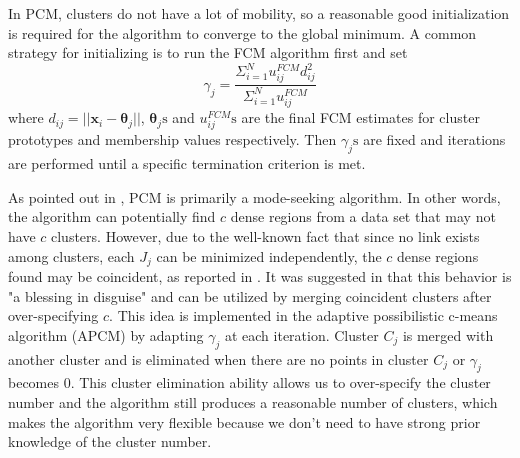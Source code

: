 \documentclass[journal,transmag]{IEEEtran}
\theoremstyle{definition}
\begin{document}
In PCM, clusters do not have a lot of mobility, so a reasonable good initialization is required for the algorithm to converge to the global minimum. A common strategy for initializing is to run the FCM algorithm first and set
\begin{equation}
\gamma_j=\frac{\Sigma_{i=1}^Nu_{ij}^{FCM}d^2_{ij}}{\Sigma_{i=1}^Nu_{ij}^{FCM}}
\end{equation}
where $d_{ij}=||\mathbf{x}_i-\boldsymbol{\theta}_j||$, $\boldsymbol{\theta}_j\text{s}$ and $u_{ij}^{FCM}\text{s}$ are the final FCM estimates for cluster prototypes and membership values respectively. Then $\gamma_j\text{s}$ are fixed and iterations are performed until a specific termination criterion is met.

As pointed out in \cite{krishnapuram_possibilistic_1996}, PCM is primarily a mode-seeking algorithm. In other words, the algorithm can potentially find $c$ dense regions from a data set that may not have $c$ clusters. However, due to the well-known fact that since no link exists among clusters, each $J_j$ can be minimized independently, the $c$ dense regions found may be coincident, as reported in \cite{barni_comments_1996}. It was suggested in \cite{krishnapuram_possibilistic_1996} that this behavior is "a blessing in disguise" and can be utilized by merging coincident clusters after over-specifying $c$. This idea is implemented in the adaptive possibilistic c-means algorithm (APCM) \cite{xenaki_novel_2016} by adapting $\gamma_j$ at each iteration. Cluster $C_j$ is merged with another cluster and is eliminated when there are no points in cluster $C_j$ or $\gamma_j$ becomes $0$. This cluster elimination ability allows us to over-specify the cluster number and the algorithm still produces a reasonable number of clusters, which makes the algorithm very flexible because we don't need to have strong prior knowledge of the cluster number.
\end{document}
